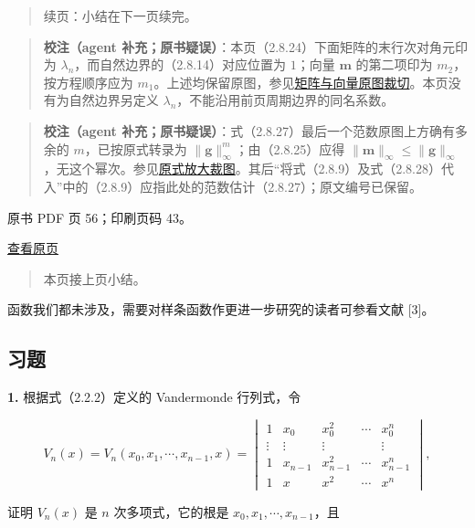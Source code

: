 \begin{quote}
续页：小结在下一页续完。
\end{quote}

\begin{quote}
\textbf{校注（agent 补充；原书疑误）}：本页（2.8.24）下面矩阵的末行次对角元印为 \(\lambda_n\)，而自然边界的（2.8.14）对应位置为 \(1\)；向量 \(\boldsymbol m\) 的第二项印为 \(m_2\)，按方程顺序应为 \(m_1\)。上述均保留原图，参见\href{verified/assets/ch02b/pdf-055-matrix-detail.png}{矩阵与向量原图裁切}。本页没有为自然边界另定义 \(\lambda_n\)，不能沿用前页周期边界的同名系数。
\end{quote}

\begin{quote}
\textbf{校注（agent 补充；原书疑误）}：式（2.8.27）最后一个范数原图上方确有多余的 \(m\)，已按原式转录为 \(\|\boldsymbol g\|_\infty^m\)；由（2.8.25）应得 \(\|\boldsymbol m\|_\infty\leqslant\|\boldsymbol g\|_\infty\)，无这个幂次。参见\href{verified/assets/ch02b/pdf-055-eq-2-8-27-detail.png}{原式放大裁图}。其后``将式（2.8.9）及式（2.8.28）代入''中的（2.8.9）应指此处的范数估计（2.8.27）；原文编号已保留。
\end{quote}

\clearpage

原书 PDF 页 56；印刷页码 43。

\href{source-images/pdf-056.jpeg}{查看原页}

\begin{quote}
本页接上页小结。
\end{quote}

函数我们都未涉及，需要对样条函数作更进一步研究的读者可参看文献 {[}3{]}。

\subsection{习题}\label{ch02b-ux4e60ux9898}

\textbf{1.} 根据式（2.2.2）定义的 Vandermonde 行列式，令

\[V_n(x)=V_n(x_0,x_1,\cdots,x_{n-1},x)=\begin{vmatrix}
1&x_0&x_0^2&\cdots&x_0^n\\
\vdots&\vdots&\vdots&&\vdots\\
1&x_{n-1}&x_{n-1}^2&\cdots&x_{n-1}^n\\
1&x&x^2&\cdots&x^n
\end{vmatrix},\]

证明 \(V_n(x)\) 是 \(n\) 次多项式，它的根是 \(x_0,x_1,\cdots,x_{n-1}\)，且

